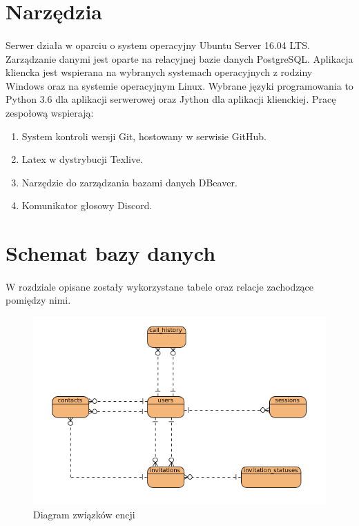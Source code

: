 \documentclass{article}
\begin{document}
  \section{Narzędzia}
  \paragraph{}Serwer działa w oparciu o system operacyjny Ubuntu Server 16.04 LTS. Zarządzanie danymi jest oparte na relacyjnej bazie danych PostgreSQL. Aplikacja kliencka jest wspierana na wybranych systemach operacyjnych z rodziny Windows oraz na systemie operacyjnym Linux. Wybrane języki programowania to Python 3.6 dla aplikacji serwerowej oraz Jython dla aplikacji klienckiej.
  Pracę zespołową wspierają:
  \begin{enumerate}
    \item System kontroli wersji Git, hostowany w serwisie GitHub.
    \item Latex w dystrybucji Texlive.
    \item Narzędzie do zarządzania bazami danych DBeaver.
    \item Komunikator głosowy Discord.
  \end{enumerate}
  \section{Schemat bazy danych}
  \paragraph{} W rozdziale opisane zostały wykorzystane tabele oraz relacje zachodzące pomiędzy nimi.
    \begin{figure}[H]
      \centering
        \includegraphics[width=1.0\linewidth]{assets/erd.png}
        \caption[]{Diagram związków encji}
        \label{fig:er}
    \end{figure}
\end{document}
